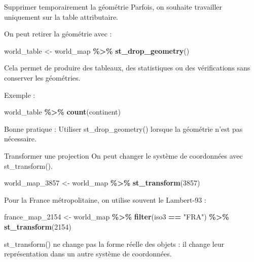 \documentclass[
  10pt,
  ignorenonframetext,
]{beamer}
\newenvironment{Shaded}{\begin{snugshade}}{\end{snugshade}}
\newcommand{\DecValTok}[1]{\textcolor[rgb]{0.00,0.00,0.81}{#1}}
\newcommand{\FunctionTok}[1]{\textcolor[rgb]{0.13,0.29,0.53}{\textbf{#1}}}
\newcommand{\NormalTok}[1]{#1}
\newcommand{\OtherTok}[1]{\textcolor[rgb]{0.56,0.35,0.01}{#1}}
\newcommand{\SpecialCharTok}[1]{\textcolor[rgb]{0.81,0.36,0.00}{\textbf{#1}}}
\newcommand{\StringTok}[1]{\textcolor[rgb]{0.31,0.60,0.02}{#1}}
\begin{document}
\begin{frame}[fragile]{Supprimer temporairement la géométrie}
\label{supprimer-temporairement-la-guxe9omuxe9trie}
Parfois, on souhaite travailler uniquement sur la table attributaire.

On peut retirer la géométrie avec :

\begin{Shaded}
\begin{Highlighting}[]
\NormalTok{world\_table }\OtherTok{\textless{}{-}}\NormalTok{ world\_map }\SpecialCharTok{\%\textgreater{}\%}
  \FunctionTok{st\_drop\_geometry}\NormalTok{()}
\end{Highlighting}
\end{Shaded}

Cela permet de produire des tableaux, des statistiques ou des
vérifications sans conserver les géométries.

Exemple :

\begin{Shaded}
\begin{Highlighting}[]
\NormalTok{world\_table }\SpecialCharTok{\%\textgreater{}\%}
  \FunctionTok{count}\NormalTok{(continent)}
\end{Highlighting}
\end{Shaded}

Bonne pratique : Utiliser st\_drop\_geometry() lorsque la géométrie
n'est pas nécessaire.
\end{frame}

\begin{frame}[fragile]{Transformer une projection}
\label{transformer-une-projection}
On peut changer le système de coordonnées avec st\_transform().

\begin{Shaded}
\begin{Highlighting}[]
\NormalTok{world\_map\_3857 }\OtherTok{\textless{}{-}}\NormalTok{ world\_map }\SpecialCharTok{\%\textgreater{}\%}
  \FunctionTok{st\_transform}\NormalTok{(}\DecValTok{3857}\NormalTok{)}
\end{Highlighting}
\end{Shaded}

Pour la France métropolitaine, on utilise souvent le Lambert-93 :

\begin{Shaded}
\begin{Highlighting}[]
\NormalTok{france\_map\_2154 }\OtherTok{\textless{}{-}}\NormalTok{ world\_map }\SpecialCharTok{\%\textgreater{}\%}
  \FunctionTok{filter}\NormalTok{(iso3 }\SpecialCharTok{==} \StringTok{"FRA"}\NormalTok{) }\SpecialCharTok{\%\textgreater{}\%}
  \FunctionTok{st\_transform}\NormalTok{(}\DecValTok{2154}\NormalTok{)}
\end{Highlighting}
\end{Shaded}

st\_transform() ne change pas la forme réelle des objets : il change
leur représentation dans un autre système de coordonnées.
\end{frame}
\end{document}
